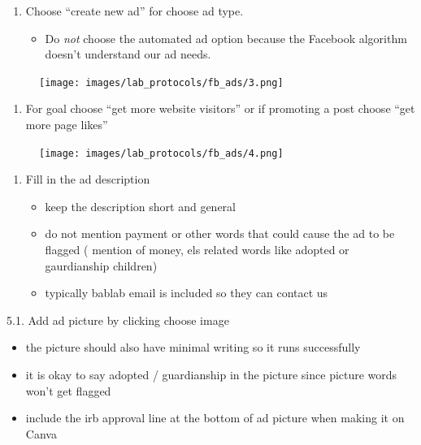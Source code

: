 \documentclass[
]{book}
\providecommand{\tightlist}{%
  \setlength{\itemsep}{0pt}\setlength{\parskip}{0pt}}
\begin{document}
\begin{enumerate}
\def\labelenumi{\arabic{enumi}.}
\setcounter{enumi}{2}
\item
  Choose ``create new ad'' for choose ad type.

  \begin{itemize}
  \tightlist
  \item
    Do \emph{not} choose the automated ad option because the Facebook algorithm doesn't understand our ad needs.
  \end{itemize}
\end{enumerate}

\begin{figure}
\centering
\texttt{[image: images/lab\_protocols/fb\_ads/3.png]}
\caption{}
\end{figure}

\begin{enumerate}
\def\labelenumi{\arabic{enumi}.}
\setcounter{enumi}{3}
\tightlist
\item
  For goal choose ``get more website visitors'' or if promoting a post choose ``get more page likes''
\end{enumerate}

\begin{figure}
\centering
\texttt{[image: images/lab\_protocols/fb\_ads/4.png]}
\caption{}
\end{figure}

\begin{enumerate}
\def\labelenumi{\arabic{enumi}.}
\setcounter{enumi}{4}
\item
  Fill in the ad description

  \begin{itemize}
  \item
    keep the description short and general
  \item
    do not mention payment or other words that could cause the ad to be flagged ( mention of money, els related words like adopted or gaurdianship children)
  \item
    typically bablab email is included so they can contact us
  \end{itemize}
\end{enumerate}

5.1. Add ad picture by clicking choose image

\begin{itemize}
\item
  the picture should also have minimal writing so it runs successfully
\item
  it is okay to say adopted / guardianship in the picture since picture words won't get flagged
\item
  include the irb approval line at the bottom of ad picture when making it on Canva
\end{itemize}
\end{document}
